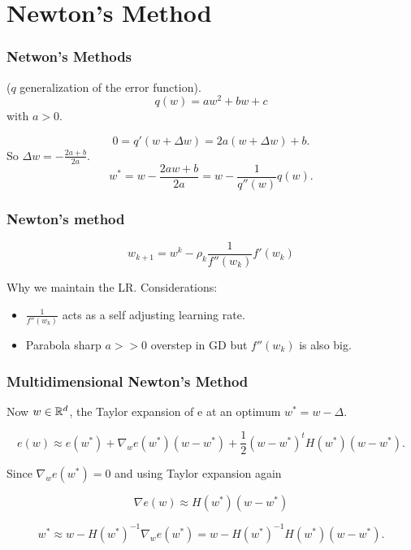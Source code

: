 \section{Newton's Method}
\begin{frame}
  \frametitle{Netwon's Methods}
($q$ generalization of the error function). 
  \begin{equation}
    q(w)
    = 
    a w^2 + bw + c 
  \end{equation}
  with $a > 0$. 

\begin{equation}
  0 = q'(w + \Delta w)
  = 
  2a(w + \Delta w) + b.
\end{equation}
So $\Delta w = - \frac{2a + b}{2a}$.
 \begin{equation}
  w^* 
  = 
  w
  - 
  \frac{2aw + b}{2 a}
  = w - \frac{1}{q''(w)} q(w).
 \end{equation} 
\end{frame}

\begin{frame}
  \frametitle{Newton's method}
    \begin{equation}
      w_{k+1}
      = 
      w^k 
      - 
      \rho_k 
      \frac{1}{f''(w_k)}f'(w_k)
    \end{equation}

    Why we maintain the LR. 
Considerations: 

  \begin{itemize}
    \item  $\frac{1}{f''(w_k)}$ acts as a self adjusting learning rate.
    \item Parabola sharp $a >> 0$ overstep in GD but $f''(w_k)$ is also big. 
  \end{itemize}

\end{frame}

\begin{frame}
  \frametitle{Multidimensional Newton's Method}

  Now $w \in \mathbb{R}^d$, the Taylor expansion of e at an optimum 
  $w^* = w - \Delta$.

  \begin{equation}
    e(w)
    \approx
    e(w^* ) 
    +
    \nabla_w e(w^*) (w - w^*)
    +
     \frac{1}{2}
     (w - w^*)^t
     H(w^*)
     (w - w^*).
  \end{equation}

  Since $\nabla_w e(w^*) = 0$ and using Taylor expansion again

  \begin{equation}
    \nabla e(w)
    \approx
    H(w^*) (w - w^*)
  \end{equation}

  \begin{equation}
    w^* 
    \approx
    w
    - H(w^*)^{-1} \nabla_w e(w^*)
  = 
  w
    - H(w^*)^{-1} H(w^*) (w - w^*). 
  \end{equation}

\end{frame}

